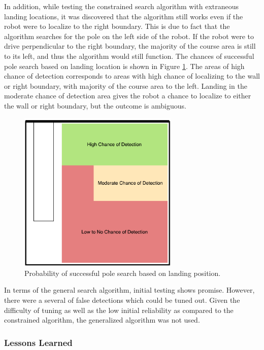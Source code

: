 \documentclass[ece]{uw-wkrpt}
\begin{document}
In addition, while testing the constrained search algorithm with extraneous landing locations, it was discovered that the algorithm still works even if the robot were to localize to the right boundary. This is due to fact that the algorithm searches for the pole on the left side of the robot. If the robot were to drive perpendicular to the right boundary, the majority of the course area is still to its left, and thus the algorithm would still function. The chances of successful pole search based on landing location is shown in Figure \ref{fig:SAdetection}. The areas of high chance of detection corresponds to areas with high chance of localizing to the wall or right boundary, with majority of the course area to the left. Landing in the moderate chance of detection area gives the robot a chance to localize to either the wall or right boundary, but the outcome is ambiguous.  

\begin{figure}
    \centering
    \includegraphics[width=3in]{res/SA-areaofdetection}
    \caption[Probability of successful pole search based on landing position]
          {Probability of successful pole search based on landing position.}
    \label{fig:SAdetection}
\end{figure}

In terms of the general search algorithm, initial testing shows promise. However, there were a several of false detections which could be tuned out. Given the difficulty of tuning as well as the low initial reliability as compared to the constrained algorithm, the generalized algorithm was not used.

\subsubsection{Lessons Learned}
\end{document}
